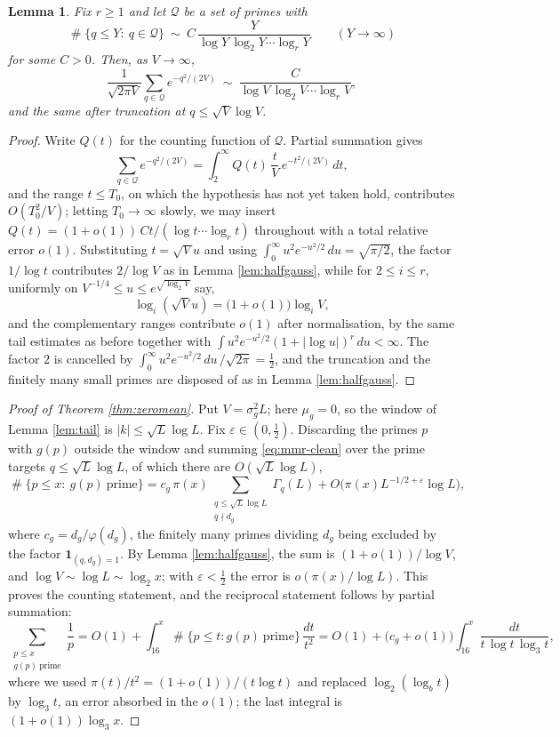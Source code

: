 \documentclass[11pt,reqno]{amsart}
\theoremstyle{plain}
\newtheorem{lemma}[theorem]{Lemma}
\theoremstyle{definition}
\DeclareMathOperator{\Card}{\#}
\begin{document}
\begin{lemma}\label{lem:sparse}
Fix $r\ge1$ and let $\mathcal Q$ be a set of primes with
\[
\Card\{q\le Y:\ q\in\mathcal Q\}\ \sim\ C\,\frac{Y}{\log Y\,\log_2Y\cdots\log_rY}
\qquad(Y\to\infty)
\]
for some $C>0$. Then, as $V\to\infty$,
\[
\frac1{\sqrt{2\pi V}}\sum_{q\in\mathcal Q}e^{-q^{2}/(2V)}
\ \sim\ \frac{C}{\log V\,\log_2V\cdots\log_rV},
\]
and the same after truncation at $q\le\sqrt V\log V$.
\end{lemma}

\begin{proof}
Write $Q(t)$ for the counting function of $\mathcal Q$. Partial summation gives
\[
\sum_{q\in\mathcal Q}e^{-q^{2}/(2V)}=\int_{2}^{\infty}Q(t)\,\frac tV\,e^{-t^{2}/(2V)}\,dt ,
\]
and the range $t\le T_0$, on which the hypothesis has not yet taken hold, contributes $O(T_0^{2}/V)$; letting $T_0\to\infty$ slowly, we may insert $Q(t)=(1+o(1))\,Ct/(\log t\cdots\log_rt)$ throughout with a total relative error $o(1)$. Substituting $t=\sqrt Vu$ and using $\int_0^\infty u^{2}e^{-u^{2}/2}\,du=\sqrt{\pi/2}$, the factor $1/\log t$ contributes $2/\log V$ as in Lemma \ref{lem:halfgauss}, while for $2\le i\le r$, uniformly on $V^{-1/4}\le u\le e^{\sqrt{\log_2 V}}$ say,
\[
\log_i(\sqrt V u)=\big(1+o(1)\big)\log_iV ,
\]
and the complementary ranges contribute $o(1)$ after normalisation, by the same tail estimates as before together with $\int u^{2}e^{-u^2/2}(1+|\log u|)^{r}\,du<\infty$. The factor $2$ is cancelled by $\int_0^\infty u^{2}e^{-u^{2}/2}\,du\,/\sqrt{2\pi}=\tfrac12$, and the truncation and the finitely many small primes are disposed of as in Lemma \ref{lem:halfgauss}.
\end{proof}

\begin{proof}[Proof of Theorem \ref{thm:zeromean}]
Put $V=\sigma_g^{2}L$; here $\mu_g=0$, so the window of Lemma \ref{lem:tail} is $|k|\le\sqrt L\log L$. Fix $\varepsilon\in(0,\tfrac12)$. Discarding the primes $p$ with $g(p)$ outside the window and summing \eqref{eq:mmr-clean} over the prime targets $q\le\sqrt L\log L$, of which there are $O(\sqrt L\log L)$,
\[
\Card\{p\le x:\ g(p)\ \text{prime}\}
=c_g\,\pi(x)\sum_{\substack{q\le\sqrt L\log L\\ q\nmid d_g}}\Gamma_q(L)
+O\big(\pi(x)L^{-1/2+\varepsilon}\log L\big),
\]
where $c_g=d_g/\varphi(d_g)$, the finitely many primes dividing $d_g$ being excluded by the factor $\mathbf 1_{(q,d_g)=1}$. By Lemma \ref{lem:halfgauss}, the sum is $(1+o(1))/\log V$, and $\log V\sim\log L\sim\log_2x$; with $\varepsilon<\tfrac12$ the error is $o(\pi(x)/\log L)$. This proves the counting statement, and the reciprocal statement follows by partial summation:
\[
\sum_{\substack{p\le x\\ g(p)\ \text{prime}}}\frac1p
=O(1)+\int_{16}^{x}\Card\{p\le t: g(p)\ \text{prime}\}\,\frac{dt}{t^{2}}
=O(1)+\big(c_g+o(1)\big)\int_{16}^{x}\frac{dt}{t\,\log t\,\log_3t},
\]
where we used $\pi(t)/t^{2}=(1+o(1))/(t\log t)$ and replaced $\log_2(\log_bt)$ by $\log_3t$, an error absorbed in the $o(1)$; the last integral is $(1+o(1))\log_3x$.
\end{proof}
\end{document}
